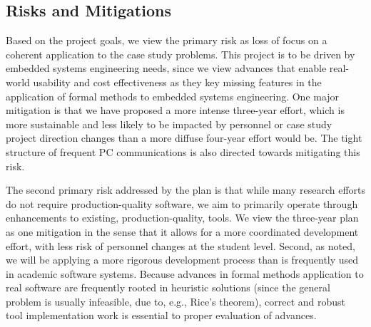 \documentclass{article}
\begin{document}
\subsection{Risks and Mitigations}

Based on the project goals, we view the primary risk as loss of focus on a coherent application to the case study problems.  This project is to be driven by embedded systems engineering needs, since we view advances that enable real-world usability and cost effectiveness as they key missing features in the application of formal methods to embedded systems engineering.  One major mitigation is that we have proposed a more intense three-year effort, which is more sustainable and less likely to be impacted by personnel or case study project direction changes than a more diffuse four-year effort would be.  The tight structure of frequent PC communications is also directed towards mitigating this risk.

The second primary risk addressed by the plan is that while many research efforts do not require production-quality software, we aim to primarily operate through enhancements to existing, production-quality, tools.  We view the three-year plan as one mitigation in the sense that it allows for a more coordinated development effort, with less risk of personnel changes at the student level.  Second, as noted, we will be applying a more rigorous development process than is frequently used in academic software systems.  Because advances in formal methods application to real software are frequently rooted in heuristic solutions (since the general problem is usually infeasible, due to, e.g., Rice's theorem), correct and robust tool implementation work is essential to proper evaluation of advances.
\end{document}
